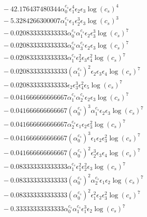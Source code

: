 \documentclass[10pt]{article}
\begin{document}
\begin{align*}
&{}  - 42.176437480344 \alpha_{0}^{c_s} \epsilon_{1}^{4} \epsilon_{2} \epsilon_{3} \log{\left(c_{s} \right)}^{4} \\
&{}  - 5.3284266300007 \alpha_{1}^{c_s} \epsilon_{1} \epsilon_{2}^{3} \epsilon_{3} \log{\left(c_{s} \right)}^{3} \\
&{}  - 0.020833333333333 \alpha_{0}^{c_s} \alpha_{1}^{c_s} \epsilon_{2} \epsilon_{3}^{3} \log{\left(c_{s} \right)}^{7} \\
&{}  - 0.020833333333333 \alpha_{0}^{c_s} \alpha_{3}^{c_s} \epsilon_{2} \epsilon_{3} \log{\left(c_{s} \right)}^{7} \\
&{}  - 0.020833333333333 \alpha_{1}^{c_s} \epsilon_{2}^{2} \epsilon_{3} \epsilon_{4}^{2} \log{\left(c_{s} \right)}^{7} \\
&{}  - 0.020833333333333 \left(\alpha_{1}^{c_s}\right)^{2} \epsilon_{2} \epsilon_{3} \epsilon_{4} \log{\left(c_{s} \right)}^{7} \\
&{}  - 0.020833333333333 \epsilon_{2} \epsilon_{3}^{3} \epsilon_{4}^{2} \epsilon_{5} \log{\left(c_{s} \right)}^{7} \\
&{}  - 0.041666666666667 \alpha_{1}^{c_s} \alpha_{2}^{c_s} \epsilon_{2} \epsilon_{3} \log{\left(c_{s} \right)}^{7} \\
&{}  - 0.041666666666667 \left(\alpha_{0}^{c_s}\right)^{3} \alpha_{1}^{c_s} \epsilon_{2} \epsilon_{3} \log{\left(c_{s} \right)}^{7} \\
&{}  - 0.041666666666667 \alpha_{2}^{c_s} \epsilon_{1} \epsilon_{2} \epsilon_{3}^{2} \log{\left(c_{s} \right)}^{7} \\
&{}  - 0.041666666666667 \left(\alpha_{0}^{c_s}\right)^{3} \epsilon_{1} \epsilon_{2} \epsilon_{3}^{2} \log{\left(c_{s} \right)}^{7} \\
&{}  - 0.041666666666667 \left(\alpha_{0}^{c_s}\right)^{2} \epsilon_{2}^{3} \epsilon_{3} \epsilon_{4} \log{\left(c_{s} \right)}^{7} \\
&{}  - 0.083333333333333 \alpha_{1}^{c_s} \epsilon_{1}^{2} \epsilon_{2}^{2} \epsilon_{3} \log{\left(c_{s} \right)}^{7} \\
&{}  - 0.083333333333333 \left(\alpha_{0}^{c_s}\right)^{2} \alpha_{2}^{c_s} \epsilon_{1} \epsilon_{2} \log{\left(c_{s} \right)}^{7} \\
&{}  - 0.083333333333333 \left(\alpha_{0}^{c_s}\right)^{2} \epsilon_{1}^{2} \epsilon_{2} \epsilon_{3}^{2} \log{\left(c_{s} \right)}^{7} \\
&{}  - 0.33333333333333 \alpha_{0}^{c_s} \alpha_{1}^{c_s} \epsilon_{1}^{3} \epsilon_{2} \log{\left(c_{s} \right)}^{7} \\

\end{align*}
\end{document}
